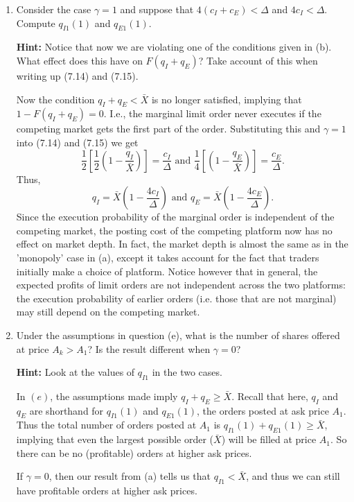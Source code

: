 \documentclass[11pt
, answers
]{exam}
\begin{document}
\begin{enumerate}[label=(\alph*). ]
	
	
	\item Consider the case $\gamma=1$ and suppose that $4(c_{I}+c_{E})<\Delta$ and $4c_{I}<\Delta$. Compute $q_{I1}(1)$ and $q_{E1}(1)$.
	
	\textbf{Hint:} Notice that now we are violating one of the conditions given in (b). What effect does this have on $F(q_{I}+q_{E})$? Take account of this when writing up (7.14) and (7.15).
	
	\begin{solution}
		Now the condition $q_{I}+q_{E}<\bar{X}$ is no longer satisfied, implying that $1-F(q_{I}+q_{E})=0$. I.e., the marginal limit order never executes if the competing market gets the first part of the order.  Substituting this and $\gamma=1$ into (7.14) and (7.15) we get
		\[
		\frac{1}{2} \left[\frac{1}{2} \left(1-\frac{q_{I}}{\bar{X}}\right)\right]=\frac{c_{I}}{\Delta} \text{ and } \frac{1}{4} \left[\left(1-\frac{q_{E}}{\bar{X}}\right)\right]=\frac{c_{E}}{\Delta}.
		\]
		Thus, 
		\[
		q_{I} = \bar{X}\left(1-\frac{4c_{I}}{\Delta}\right) \text{ and } q_{E} = \bar{X}\left(1-\frac{4c_{E}}{\Delta}\right).
		\]
		Since the execution probability of the marginal order is independent of the competing market, the posting cost of the competing platform now has no effect on market depth. In fact, the market depth is almost the same as in the 'monopoly' case in (a), except it takes account for the fact that traders initially make a choice of platform. Notice however that in general, the expected profits of limit orders are not independent across the two platforms: the execution probability of earlier orders (i.e. those that are not marginal) may still depend on the competing market.
	\end{solution}
	
	
	
	\item Under the assumptions in question (e), what is the number of shares offered at price $A_{k}>A_{1}$? Is the result different when $\gamma=0$?
	
	\textbf{Hint:} Look at the values of $q_{I1}$ in the two cases.
	
	\begin{solution}
		In $(e)$, the assumptions made imply  $q_{I}+q_{E} \geq \bar{X}$. Recall that here, $q_I$ and $q_E$ are shorthand for $q_{I1}(1)$ and $q_{E1}(1)$, the orders posted at ask price $A_1$. Thus the total number of orders posted at $A_1$ is $q_{I1}(1)+q_{E1}(1) \geq \bar{X}$, implying that even the largest possible order ($\bar{X}$) will be filled at price $A_1$. So there can be no (profitable) orders at higher ask prices. 
		
		If $\gamma=0$, then our result from (a) tells us that $q_{I1}<\bar{X}$, and thus we can still have profitable orders at higher ask prices.
	\end{solution}

\end{enumerate}
\end{document}
